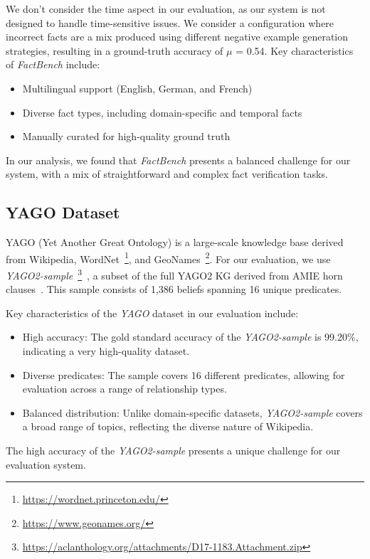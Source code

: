 We don't consider the time aspect in our evaluation, as our system is not designed to handle time-sensitive issues.
We consider a configuration where incorrect facts are a mix produced using different negative example generation strategies, resulting in a ground-truth accuracy of $\mu$ = 0.54.
Key characteristics of \textit{FactBench} include:
\begin{itemize}
    \item Multilingual support (English, German, and French)
    \item Diverse fact types, including domain-specific and temporal facts
    \item Manually curated for high-quality ground truth
\end{itemize}

In our analysis, we found that \textit{FactBench} presents a balanced challenge for our system, with a mix of straightforward and complex fact verification tasks.
\subsection{YAGO Dataset}\label{subsec:empirical-evaluation:dataset-analysis:yago}
YAGO (Yet Another Great Ontology) is a large-scale knowledge base derived from Wikipedia, WordNet~\footnote{\url{https://wordnet.princeton.edu/}}, and GeoNames~\footnote{\url{https://www.geonames.org/}}.
For our evaluation, we use \textit{YAGO2-sample}~\footnote{\url{https://aclanthology.org/attachments/D17-1183.Attachment.zip}}~\cite{ojha-talukdar-2017-kgeval}, a subset of the full YAGO2 \ac{KG} derived from AMIE horn clauses~\cite{Yago_AMIE}.
This sample consists of 1,386 beliefs spanning 16 unique predicates.

Key characteristics of the \textit{YAGO} dataset in our evaluation include:
\begin{itemize}
    \item High accuracy: The gold standard accuracy of the \textit{YAGO2-sample} is 99.20\%, indicating a very high-quality dataset.
    \item Diverse predicates: The sample covers 16 different predicates, allowing for evaluation across a range of relationship types.
    \item Balanced distribution: Unlike domain-specific datasets, \textit{YAGO2-sample} covers a broad range of topics, reflecting the diverse nature of Wikipedia.
\end{itemize}

The high accuracy of the \textit{YAGO2-sample} presents a unique challenge for our evaluation system.
